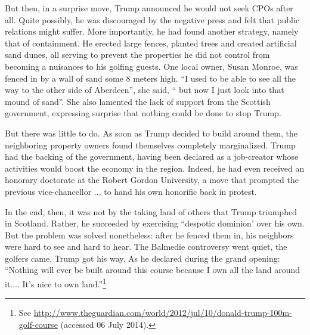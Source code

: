 But then, in a surprise move, Trump announced he would not seek CPOs after all. Quite possibly, he was discouraged by the negative press and felt that public relations might suffer. More importantly, he had found another strategy, namely that of containment.
He erected large fences, planted trees and created artificial sand dunes, all serving to prevent the properties he did not control from becoming a nuisances to his golfing guests. One local owner, Susan Monroe, was fenced in by a wall of sand some 8 meters high. ``I used to be able to see all the way to the other side of Aberdeen'', she said, `` but now I just look into that mound of sand''. She also lamented the lack of support from the Scottish government, expressing surprise that nothing could be done to stop Trump.

But there was little to do. As soon as Trump decided to build around them, the neighboring property owners found themselves completely marginalized. Trump had the backing of the government, having been declared as a job-creator whose activities would boost the economy in the region. Indeed, he had even received an honorary doctorate at the Robert Gordon University, a move that prompted the previous vice-chancellor ... to hand his own honorific back in protest.

In the end, then, it was not by the taking land of others that Trump triumphed in Scotland. Rather, he succeeded by exercising ``despotic dominion' over his own. But the problem was solved nonetheless: after he fenced them in, his neighbors were hard to see and hard to hear. The Balmedie controversy went quiet, the golfers came, Trump got his way. As he declared during the grand opening: ``Nothing will ever be built around this course because I own all the land around it.... It's nice to own land.''\footnote{See \url{http://www.theguardian.com/world/2012/jul/10/donald-trump-100m-golf-course} (accessed 06 July 2014).}

